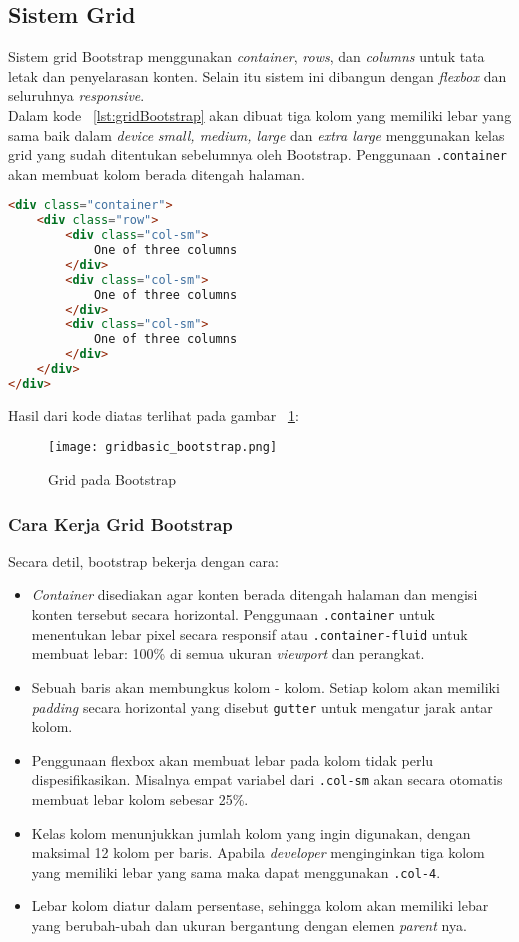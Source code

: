 \subsection{Sistem Grid}
Sistem grid Bootstrap menggunakan \textit{container}, \textit{rows}, dan \textit{columns} untuk tata letak dan penyelarasan konten. Selain itu sistem ini dibangun dengan \textit{flexbox} dan seluruhnya \textit{responsive}. \\

\noindent Dalam kode ~\ref{lst:gridBootstrap} akan dibuat tiga kolom yang memiliki lebar yang sama baik dalam \textit{device} \textit{small, medium, large} dan \textit{extra large} menggunakan kelas grid yang sudah ditentukan sebelumnya oleh Bootstrap. Penggunaan \verb|.container| akan membuat kolom berada ditengah halaman.
\begin{lstlisting}[style=customhtml, language=HTML,  basicstyle=\ttfamily, frame=single, columns=fullflexible, keepspaces=true, breaklines=true, showstringspaces=false, label={lst:gridBootstrap}, caption=Sistem grid pada bootstrap 4] 
<div class="container">
	<div class="row">
		<div class="col-sm">
			One of three columns
		</div>
		<div class="col-sm">
			One of three columns
		</div>
		<div class="col-sm">
			One of three columns
		</div>
	</div>
</div>
\end{lstlisting}
\noindent Hasil dari kode diatas terlihat pada gambar ~\ref{fig:gridBootstrap}:
\begin{figure} [H]
	\centering  
	\texttt{[image: gridbasic\_bootstrap.png]}  
	\caption{Grid pada Bootstrap} 
	\label{fig:gridBootstrap}
\end{figure}

\subsubsection{Cara Kerja Grid Bootstrap}
\noindent Secara detil, bootstrap bekerja dengan cara:
\begin{itemize}
	\item \textit{Container} disediakan agar konten berada ditengah halaman dan mengisi konten tersebut secara horizontal. Penggunaan \verb|.container| untuk menentukan lebar pixel secara responsif atau \verb|.container-fluid| untuk membuat lebar: 100\%  di semua ukuran \textit{viewport} dan perangkat.
	\item Sebuah baris akan membungkus kolom - kolom. Setiap kolom akan memiliki \textit{padding} secara horizontal yang disebut \verb|gutter| untuk mengatur jarak antar kolom.
	\item Penggunaan flexbox akan membuat lebar pada kolom tidak perlu dispesifikasikan. Misalnya empat variabel dari \texttt{.col-sm} akan secara otomatis membuat lebar kolom sebesar 25\%.
	\item Kelas kolom menunjukkan jumlah kolom yang ingin digunakan, dengan maksimal 12 kolom per baris. Apabila \textit{developer} menginginkan tiga kolom yang memiliki lebar yang sama maka dapat menggunakan \texttt{.col-4}.
	\item Lebar kolom diatur dalam persentase, sehingga kolom akan memiliki lebar yang berubah-ubah dan ukuran bergantung dengan elemen \textit{parent} nya.
\end{itemize}
